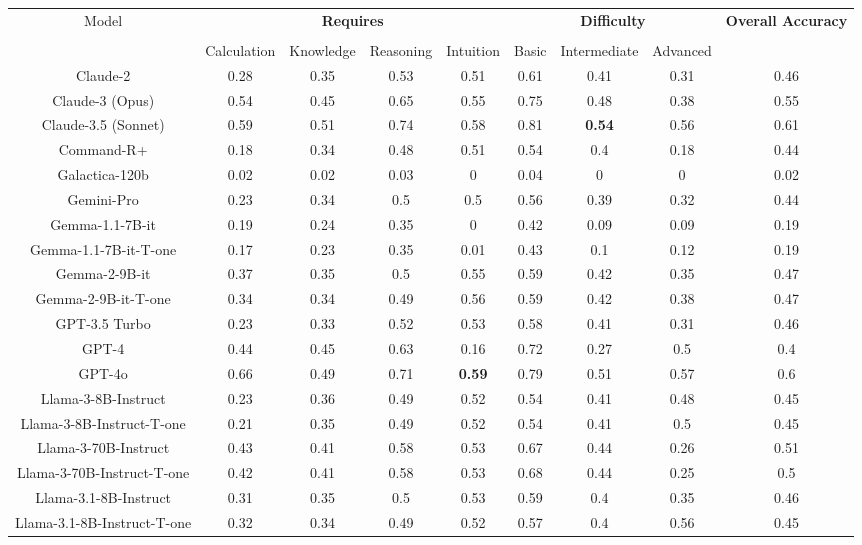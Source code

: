 \begin{tabular}{ccccccccc}
\toprule
\multirow{3}{*}{Model} & \multicolumn{4}{c}{\textbf{Requires}} & \multicolumn{3}{c}{\textbf{Difficulty}} & \multirow{3}{*}{\textbf{Overall Accuracy}}\\\cmidrule(lr){2-5} \cmidrule(lr){6-8}\\
 & Calculation & Knowledge & Reasoning & Intuition & Basic & Intermediate & Advanced &  \\
\midrule
Claude-2 & 0.28 & 0.35 & 0.53 & 0.51 & 0.61 & 0.41 & 0.31 & 0.46 \\
Claude-3 (Opus) & 0.54 & 0.45 & 0.65 & 0.55 & 0.75 & 0.48 & 0.38 & 0.55 \\
Claude-3.5 (Sonnet) & 0.59 & 0.51 & 0.74 & 0.58 & 0.81 & \textbf{0.54} & 0.56 & 0.61 \\
Command-R+ & 0.18 & 0.34 & 0.48 & 0.51 & 0.54 & 0.4 & 0.18 & 0.44 \\
Galactica-120b & 0.02 & 0.02 & 0.03 & 0 & 0.04 & 0 & 0 & 0.02 \\
Gemini-Pro & 0.23 & 0.34 & 0.5 & 0.5 & 0.56 & 0.39 & 0.32 & 0.44 \\
Gemma-1.1-7B-it & 0.19 & 0.24 & 0.35 & 0 & 0.42 & 0.09 & 0.09 & 0.19 \\
Gemma-1.1-7B-it-T-one & 0.17 & 0.23 & 0.35 & 0.01 & 0.43 & 0.1 & 0.12 & 0.19 \\
Gemma-2-9B-it & 0.37 & 0.35 & 0.5 & 0.55 & 0.59 & 0.42 & 0.35 & 0.47 \\
Gemma-2-9B-it-T-one & 0.34 & 0.34 & 0.49 & 0.56 & 0.59 & 0.42 & 0.38 & 0.47 \\
GPT-3.5 Turbo & 0.23 & 0.33 & 0.52 & 0.53 & 0.58 & 0.41 & 0.31 & 0.46 \\
GPT-4 & 0.44 & 0.45 & 0.63 & 0.16 & 0.72 & 0.27 & 0.5 & 0.4 \\
GPT-4o & 0.66 & 0.49 & 0.71 & \textbf{0.59} & 0.79 & 0.51 & 0.57 & 0.6 \\
Llama-3-8B-Instruct & 0.23 & 0.36 & 0.49 & 0.52 & 0.54 & 0.41 & 0.48 & 0.45 \\
Llama-3-8B-Instruct-T-one & 0.21 & 0.35 & 0.49 & 0.52 & 0.54 & 0.41 & 0.5 & 0.45 \\
Llama-3-70B-Instruct & 0.43 & 0.41 & 0.58 & 0.53 & 0.67 & 0.44 & 0.26 & 0.51 \\
Llama-3-70B-Instruct-T-one & 0.42 & 0.41 & 0.58 & 0.53 & 0.68 & 0.44 & 0.25 & 0.5 \\
Llama-3.1-8B-Instruct & 0.31 & 0.35 & 0.5 & 0.53 & 0.59 & 0.4 & 0.35 & 0.46 \\
Llama-3.1-8B-Instruct-T-one & 0.32 & 0.34 & 0.49 & 0.52 & 0.57 & 0.4 & 0.56 & 0.45 \\

\end{tabular}
